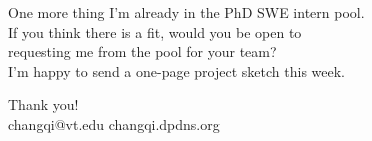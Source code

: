 \documentclass[aspectratio=169,11pt]{beamer}
\begin{document}
\begin{frame}{One more thing}
\centering
\Large I'm already in the \alert{PhD SWE intern pool}.\\[1em]
\normalsize If you think there is a fit, would you be open to\\
requesting me from the pool for your team?\\[1.2em]
\small I'm happy to send a one-page project sketch this week.
\end{frame}

\begin{frame}[standout]
Thank you!\\[.6em]
{\normalsize changqi@vt.edu \quad changqi.dpdns.org}
\end{frame}
\end{document}
